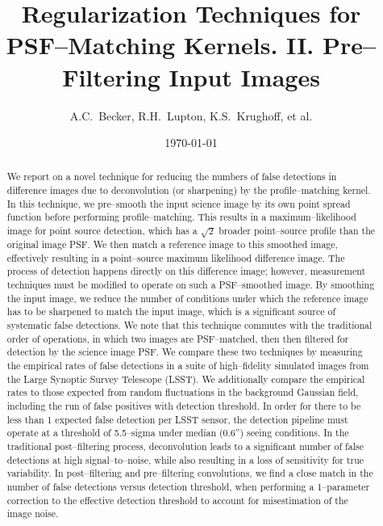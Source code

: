 \documentclass[floatfix, apj]{emulateapj}
\begin{document}
\title{Regularization Techniques for PSF--Matching Kernels. II. Pre--Filtering Input Images}

\author{
A.C.~Becker,
R.H.~Lupton,
K.S.~Krughoff,
et al.
}

\date{\today}

\begin{abstract}

We report on a novel technique for reducing the numbers of false detections in difference images due to deconvolution (or sharpening) by the profile--matching kernel.
In this technique, we pre--smooth the input science image by its own point spread function before performing profile--matching.
This results in a maximum--likelihood image for point source detection, which has a $\sqrt{2}$ broader point--source profile than the original image PSF.
We then match a reference image to this smoothed image, effectively resulting in a point--source maximum likelihood difference image.
The process of detection happens directly on this difference image; however, measurement techniques must be modified to operate on such a PSF--smoothed image.
By smoothing the input image, we reduce the number of conditions under which the reference image has to be sharpened to match the input image, which is a significant source of systematic false detections.
We note that this technique commutes with the traditional order of operations, in which two images are PSF--matched, then then filtered for detection by the science image PSF.
We compare these two techniques by measuring the empirical rates of false detections in a suite of high--fidelity simulated images from the Large Synoptic Survey Telescope (LSST).
We additionally compare the empirical rates to those expected from random fluctuations in the background Gaussian field, including the run of false positives with detection threshold.
In order for there to be less than 1 expected false detection per LSST sensor, the detection pipeline must operate at a threshold of 5.5--sigma under median (0.6'') seeing conditions.
%
In the traditional post--filtering process, deconvolution leads to a significant number of false detections at high signal--to--noise, while also resulting in a loss of sensitivity for true variability.
In post--filtering and pre--filtering convolutions, we find a close match in the number of false detections versus detection threshold, when performing a 1--parameter correction to the effective detection threshold to account for misestimation of the image noise.

\end{abstract}
\end{document}
